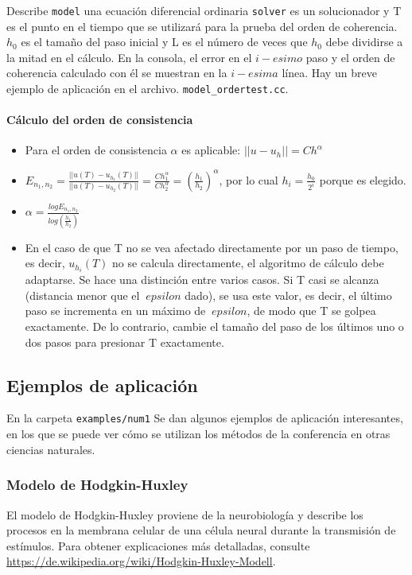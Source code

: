 \documentclass[a4paper,11pt]{article}
\theoremstyle{definition}
\begin{document}
Describe \lstinline{model} una ecuación diferencial
ordinaria \lstinline{solver} es un solucionador y T es el punto en el tiempo que se utilizará 
para la prueba del orden de coherencia. $ h_0 $ es el tamaño del paso inicial y L es el número 
de veces que $ h_0 $ debe dividirse a la mitad en el cálculo. En la consola, el error en el $i-esimo$ 
paso y el orden de coherencia calculado con él se muestran en la $i-esima$ línea. 
Hay un breve ejemplo de aplicación en el archivo. 
\lstinline{model_ordertest.cc}.

\paragraph{Cálculo del orden de consistencia}
\begin{itemize}
\item Para el orden de consistencia $\alpha$ es aplicable: $||u-u_h||=Ch^\alpha$
\item
  $E_{n_1,n_2}= \frac{||u(T)-u_{h_1}(T)||}{||u(T)-u_{h_2}(T)||} =
  \frac{Ch_1^\alpha}{Ch_2^\alpha}=
  \left(\frac{h_1}{h_2}\right)^\alpha$, por lo cual $h_i=\frac{h_0}{2^i}$
  porque es elegido.
\item
  $\alpha= \frac{log E_{n_1,n_2}}{log \left( \frac{h_1}{h_2} \right)}$
\item En el caso de que T no se vea afectado directamente por un paso de tiempo, es decir, $ u_ {h_i} (T) $ no se calcula directamente, el algoritmo de cálculo debe adaptarse. Se hace una distinción entre varios casos. Si T casi se alcanza 
(distancia menor que el $ \ epsilon $ dado), se usa este valor, es decir, el último paso se incrementa en un 
máximo de $ \ epsilon $, de modo que T se golpea exactamente. De lo contrario, cambie el tamaño del paso de 
los últimos uno o dos pasos para presionar T exactamente.
\end{itemize}



\subsection{Ejemplos de aplicación}
En la carpeta \lstinline{examples/num1} Se dan algunos ejemplos de aplicación interesantes, en los que se puede ver cómo se utilizan los métodos de la conferencia en otras ciencias naturales.

\subsubsection{Modelo de Hodgkin-Huxley}
El modelo de Hodgkin-Huxley proviene de la neurobiología y describe los procesos en la membrana celular de una célula neural durante la transmisión de estímulos. Para obtener explicaciones más detalladas, consulte \url{https://de.wikipedia.org/wiki/Hodgkin-Huxley-Modell}.
\end{document}
